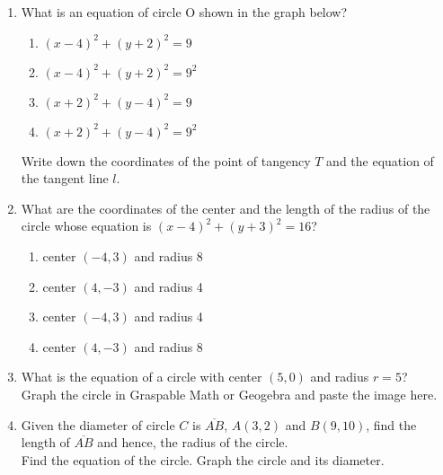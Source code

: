 \documentclass[12pt, twoside]{article}
\begin{document}
\begin{enumerate}
\newpage
\item What is an equation of circle O shown in the graph below?
  \begin{center}
  \end{center}
  \begin{multicols}{2}
    \begin{enumerate}
      \item $(x-4)^2+(y+2)^2=9$
      \item $(x-4)^2+(y+2)^2=9^2$
      \item $(x+2)^2+(y-4)^2=9$
      \item $(x+2)^2+(y-4)^2=9^2$
    \end{enumerate}
  \end{multicols}
  Write down the coordinates of the point of tangency $T$ and the equation of the tangent line $l$.
     
\newpage
\item What are the coordinates of the center and the length of the radius of the circle whose equation is $(x-4)^2+(y+3)^2=16$?
    \begin{enumerate}
      \item center $(-4,3)$ and radius 8
      \item center $(4,-3)$ and radius 4
      \item center $(-4,3)$ and radius 4
      \item center $(4,-3)$ and radius 8
    \end{enumerate}

\newpage
\item What is the equation of a circle with center $(5,0)$ and radius $r=5$?\\[0.5cm]
  Graph the circle in Graspable Math or Geogebra and paste the image here.

\newpage
\item Given the diameter of circle $C$ is $\overline{AB}$, $A(3,2)$ and $B(9,10)$, find the length of $\overline{AB}$ and hence, the radius of the circle.\\[0.25cm]
Find the equation of the circle. Graph the circle and its diameter.


\end{enumerate}
\end{document}
